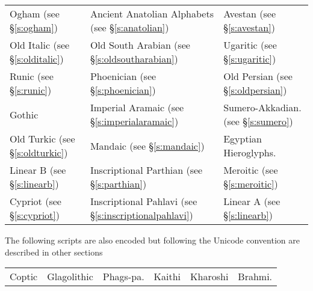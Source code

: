 \begin{center}
\begin{tabular}{lll}
Ogham (see \S\ref{s:ogham})           
&Ancient Anatolian Alphabets (see \S\ref{s:anatolian})
&Avestan (see \S\ref{s:avestan})\\
Old Italic (see \S\ref{s:olditalic})       
&Old South Arabian (see \S\ref{s:oldsoutharabian})          
&Ugaritic (see \S\ref{s:ugaritic})\\
Runic (see \S\ref{s:runic})            
&Phoenician (see \S\ref{s:phoenician})                  
&Old Persian (see \S\ref{s:oldpersian})\\
Gothic            
&Imperial Aramaic (see \S\ref{s:imperialaramaic})            
&Sumero-Akkadian. (see \S\ref{s:sumero})\\
Old Turkic (see \S\ref{s:oldturkic})     
&Mandaic (see \S\ref{s:mandaic}) 
&Egyptian Hieroglyphs.\\
Linear B (see \S\ref{s:linearb})          
&Inscriptional Parthian (see \S\ref{s:parthian})      
&Meroitic (see \S\ref{s:meroitic})\\
Cypriot (see \S\ref{s:cypriot})
&Inscriptional Pahlavi  (see \S\ref{s:inscriptionalpahlavi})       
&Linear A (see \S\ref{s:linearb})\\
\end{tabular}
\end{center}

The following scripts are also encoded but following the Unicode
convention are described in other sections

\begin{center}
\begin{tabular}{llllll}
Coptic &Glagolithic &Phags-pa. &Kaithi &Kharoshi &Brahmi.\\
\end{tabular}
\end{center}












^^A













